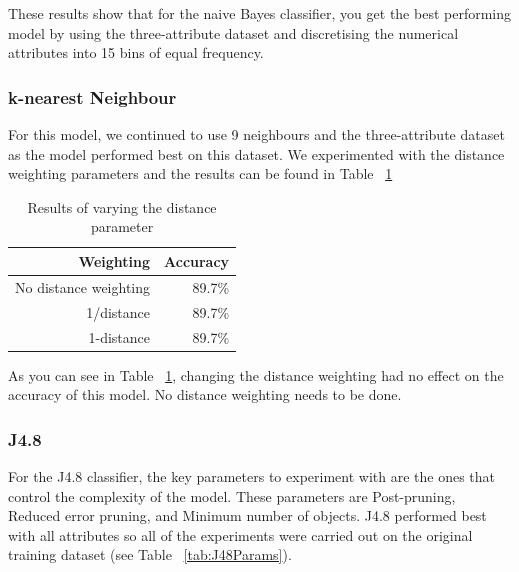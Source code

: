 \documentclass[a4paper,11pt]{article}
\begin{document}
These results show that for the naive Bayes classifier, you get the best performing model by using the three-attribute
dataset and discretising the numerical attributes into 15 bins of equal frequency.

\subsubsection{k-nearest Neighbour}

For this model, we continued to use 9 neighbours and the three-attribute dataset as the model performed best on this dataset.
We experimented with the distance weighting parameters and the results can be found in Table ~\ref{tab:kNNParams}

\begin{table}[H]
  \begin{center}
    \begin{tabular}{r | r}
      Weighting & Accuracy  \\ \hline
      No distance weighting & 89.7\% \\
      1/distance & 89.7\% \\
      1-distance & 89.7\% \\
    \end{tabular}
  \end{center}
  \caption{Results of varying the distance parameter}
  \label{tab:kNNParams}
\end{table}

As you can see in Table ~\ref{tab:kNNParams}, changing the distance weighting had no effect on the accuracy of this model.
No distance weighting needs to be done.

\subsubsection{J4.8}

For the J4.8 classifier, the key parameters to experiment with are the ones that control the complexity of the model.
These parameters are Post-pruning, Reduced error pruning, and Minimum number of objects. J4.8 performed best with
all attributes so all of the experiments were carried out on the original training dataset (see Table ~\ref{tab:J48Params}).
\end{document}
